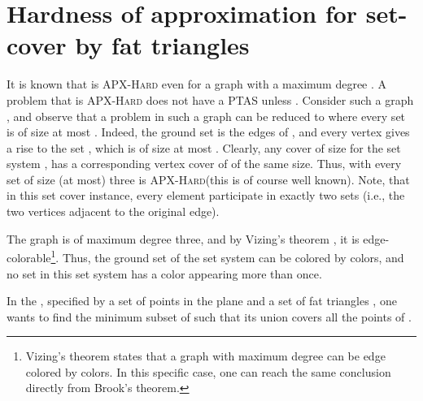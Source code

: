\documentclass[12pt]{article}
\providecommand{\ComplexityClass}[1]{{{\textcolor[named]{\si{OliveGreen}}{\textsc{#1}}}}}
\providecommand{\APXHard}{{\ComplexityClass{\si{APX}-Hard}}\xspace}
\providecommand{\PTAS}{\textsf{\si{PTAS}}\xspace}
\begin{document}
\section{Hardness of approximation for set-cover 
   by fat triangles}

It is known that  is \APXHard even for a graph
with a maximum degree  \cite{acgkm-ca-99}. A problem that is
\APXHard does not have a \PTAS unless .  Consider such a
graph , and observe that a  problem in
such a graph can be reduced to  where every set is
of size at most . Indeed, the ground set  is the edges of
, and every vertex  gives a rise to the set , which is of size at
most . Clearly, any cover  of size  for the set system
, has a
corresponding vertex cover of  of the same size. Thus,
 with every set of size (at most) three is
\APXHard (this is of course well known). Note, that in this set cover
instance, every element participate in exactly two sets (i.e., the two
vertices adjacent to the original edge).

The graph  is of maximum degree three, and by Vizing's theorem
\cite{bm-gta-76}, it is  edge-colorable\footnote{Vizing's theorem
   states that a graph with maximum degree  can be edge
   colored by  colors. In this specific case, one can reach
   the same conclusion directly from Brook's theorem.}.  Thus, the
ground set of the set system  can be colored by 
colors, and no set in this set system has a color appearing more than
once.


In the , specified by a set of
points in the plane  and a set of fat triangles ,
one wants to find the minimum subset of  such that its union
covers all the points of .
\end{document}
